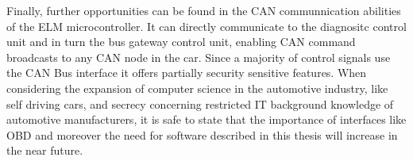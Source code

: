 Finally, further opportunities can be found in the CAN communnication abilities of the ELM microcontroller. It can directly communicate to the diagnositc control unit and 
in turn the bus gateway control unit, enabling CAN command broadcasts to any CAN node in the car. Since a majority of control signals use the CAN Bus interface it offers partially 
security sensitive features. When considering the expansion of computer science in the automotive industry, like self driving cars, and secrecy concerning restricted IT background knowledge of 
automotive manufacturers, it is safe to state that the importance of interfaces like OBD and moreover the need for software described in this thesis will increase in the near future.  

